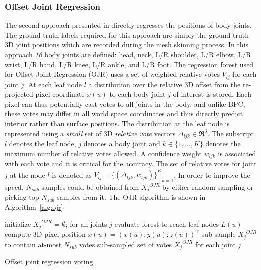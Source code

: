 \subsubsection{Offset Joint Regression} The second approach presented in \cite{Shotton2013} directly regresses the positions of body joints. The ground truth labels required for this approach are simply the ground truth 3D joint positions which are recorded during the mesh skinning process. In this approach \emph{16} body joints are defined: head, neck, L/R shoulder, L/R elbow, L/R wrist, L/R hand, L/R knee, L/R ankle, and L/R foot. The regression forest used for Offset Joint Regression (OJR) uses a set of weighted relative votes $V_{lj}$ for each joint $j$. At each leaf node $l$ a distribution over the relative 3D offset from the re-projected pixel coordinate $x(u)$ to each body joint $j$ of interest is stored. Each pixel can thus potentially cast votes to all joints in the body, and unlike BPC, these votes may differ in all world space coordinates and thus directly predict interior rather than surface positions. The distribution at the leaf node is represented using a \emph{small} set of 3D \emph{relative vote} vectors $\Delta_{ljk} \in \Re^3$. The subscript $l$ denotes the leaf node, $j$ denotes a body joint and $k \in \lbrace 1,...,K \rbrace$ denotes the maximum number of relative votes allowed. A confidence weight $w_{ljk}$ is associated with each vote and it is critical for the accuracy. The set of relative votes for joint $j$ at the node $l$ is denoted as $V_{lj}={{\lbrace (\Delta_{ljk},w_{ljk}) \rbrace}^K}_{k=1}$. In order to improve the speed, $N_{sub}$ samples could be obtained from ${X_j}^{OJR}$ by either random sampling or picking top $N_{sub}$ samples from it. The OJR algorithm is shown in Algorithm~\ref{alg:ojr}

\begin{algorithm}
 initialize ${X_j}^{OJR}$ = $\emptyset$; for all joints $j$ \;
  { 
   evaluate forest to reach leaf nodes $L(u)$ \;
   compute 3D pixel position $x(u) = (x(u); y(u); z(u))^\text{T}$ \;
  }
  sub-sample ${X_j}^{OJR}$ to contain at-most $N_{sub}$ votes \;
  \Return sub-sampled set of votes ${X_j}^{OJR}$ for each joint $j$ \;
 \caption{Offset joint regression voting}
 \label{alg:ojr}
\end{algorithm}

